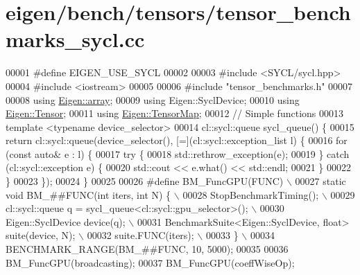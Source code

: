 \hypertarget{eigen_2bench_2tensors_2tensor__benchmarks__sycl_8cc_source}{}\section{eigen/bench/tensors/tensor\+\_\+benchmarks\+\_\+sycl.cc}
\label{eigen_2bench_2tensors_2tensor__benchmarks__sycl_8cc_source}

\begin{DoxyCode}
00001 \textcolor{preprocessor}{#define EIGEN\_USE\_SYCL}
00002 
00003 \textcolor{preprocessor}{#include <SYCL/sycl.hpp>}
00004 \textcolor{preprocessor}{#include <iostream>}
00005 
00006 \textcolor{preprocessor}{#include "tensor\_benchmarks.h"}
00007 
00008 \textcolor{keyword}{using} \hyperlink{class_eigen_1_1array}{Eigen::array};
00009 \textcolor{keyword}{using} Eigen::SyclDevice;
00010 \textcolor{keyword}{using} \hyperlink{class_eigen_1_1_tensor}{Eigen::Tensor};
00011 \textcolor{keyword}{using} \hyperlink{class_eigen_1_1_tensor_map}{Eigen::TensorMap};
00012 \textcolor{comment}{// Simple functions}
00013 \textcolor{keyword}{template} <\textcolor{keyword}{typename} device\_selector>
00014 cl::sycl::queue sycl\_queue() \{
00015   \textcolor{keywordflow}{return} cl::sycl::queue(device\_selector(), [=](cl::sycl::exception\_list l) \{
00016     \textcolor{keywordflow}{for} (\textcolor{keyword}{const} \textcolor{keyword}{auto}& e : l) \{
00017       \textcolor{keywordflow}{try} \{
00018         std::rethrow\_exception(e);
00019       \} \textcolor{keywordflow}{catch} (cl::sycl::exception e) \{
00020         std::cout << e.what() << std::endl;
00021       \}
00022     \}
00023   \});
00024 \}
00025 
00026 \textcolor{preprocessor}{#define BM\_FuncGPU(FUNC)                                       \(\backslash\)}
00027 \textcolor{preprocessor}{  static void BM\_##FUNC(int iters, int N) \{                    \(\backslash\)}
00028 \textcolor{preprocessor}{    StopBenchmarkTiming();                                     \(\backslash\)}
00029 \textcolor{preprocessor}{    cl::sycl::queue q = sycl\_queue<cl::sycl::gpu\_selector>();  \(\backslash\)}
00030 \textcolor{preprocessor}{    Eigen::SyclDevice device(q);                               \(\backslash\)}
00031 \textcolor{preprocessor}{    BenchmarkSuite<Eigen::SyclDevice, float> suite(device, N); \(\backslash\)}
00032 \textcolor{preprocessor}{    suite.FUNC(iters);                                         \(\backslash\)}
00033 \textcolor{preprocessor}{  \}                                                            \(\backslash\)}
00034 \textcolor{preprocessor}{  BENCHMARK\_RANGE(BM\_##FUNC, 10, 5000);}
00035 
00036 BM\_FuncGPU(broadcasting);
00037 BM\_FuncGPU(coeffWiseOp);
\end{DoxyCode}
